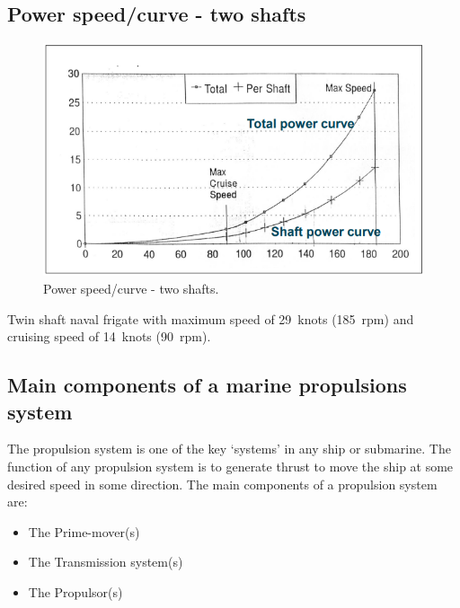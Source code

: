 \subsection{Power speed/curve - two shafts}
\begin{figure}[H]
    \centering
    \includegraphics[width =0.8 \textwidth]{img/figure54.png}
    \caption{Power speed/curve - two shafts.}
\end{figure}
Twin shaft naval frigate with maximum speed of \SI{29}{knots} (\SI{185}{rpm}) and cruising speed of \SI{14}{knots} (\SI{90}{rpm}).
\subsection{Main components of a marine propulsions system}
The propulsion system is one of the key `systems' in any ship or submarine. The function of any propulsion system is to generate thrust to move the ship at some desired speed in some direction. The main components of a propulsion system are:
\begin{itemize}
    \item The Prime-mover(s)
    \item The Transmission system(s)
    \item The Propulsor(s)
\end{itemize}
